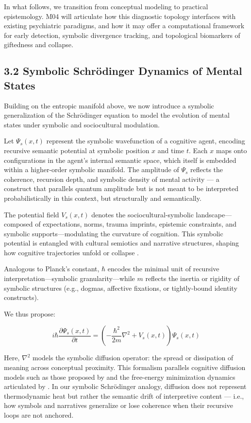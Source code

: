 In what follows, we transition from conceptual modeling to practical epistemology. M04 will articulate how this diagnostic topology interfaces with existing psychiatric paradigms, and how it may offer a computational framework for early detection, symbolic divergence tracking, and topological biomarkers of giftedness and collapse.

\subsection*{3.2 Symbolic Schrödinger Dynamics of Mental States}

Building on the entropic manifold above, we now introduce a symbolic generalization of the Schrödinger equation to model the evolution of mental states under symbolic and sociocultural modulation.

Let \( \Psi_s(x, t) \) represent the symbolic wavefunction of a cognitive agent, encoding recursive semantic potential at symbolic position \( x \) and time \( t \). Each \( x \) maps onto configurations in the agent's internal semantic space, which itself is embedded within a higher-order symbolic manifold. The amplitude of \( \Psi_s \) reflects the coherence, recursion depth, and symbolic density of mental activity — a construct that parallels quantum amplitude but is not meant to be interpreted probabilistically in this context, but structurally and semantically.

The potential field \( V_s(x, t) \) denotes the sociocultural-symbolic landscape—composed of expectations, norms, trauma imprints, epistemic constraints, and symbolic supports—modulating the curvature of cognition. This symbolic potential is entangled with cultural semiotics and narrative structures, shaping how cognitive trajectories unfold or collapse \cite{lotman1990, deacon2011}.

Analogous to Planck’s constant, \( \hbar \) encodes the minimal unit of recursive interpretation—symbolic granularity—while \( m \) reflects the inertia or rigidity of symbolic structures (e.g., dogmas, affective fixations, or tightly-bound identity constructs).

We thus propose:

\[
i\hbar \frac{\partial \Psi_s(x, t)}{\partial t} = \left( -\frac{\hbar^2}{2m} \nabla^2 + V_s(x, t) \right) \Psi_s(x, t)
\]

Here, \( \nabla^2 \) models the symbolic diffusion operator: the spread or dissipation of meaning across conceptual proximity. This formalism parallels cognitive diffusion models such as those proposed by \cite{busemeyer2012} and the free-energy minimization dynamics articulated by \cite{friston2010}. In our symbolic Schrödinger analogy, diffusion does not represent thermodynamic heat but rather the semantic drift of interpretive content — i.e., how symbols and narratives generalize or lose coherence when their recursive loops are not anchored.

